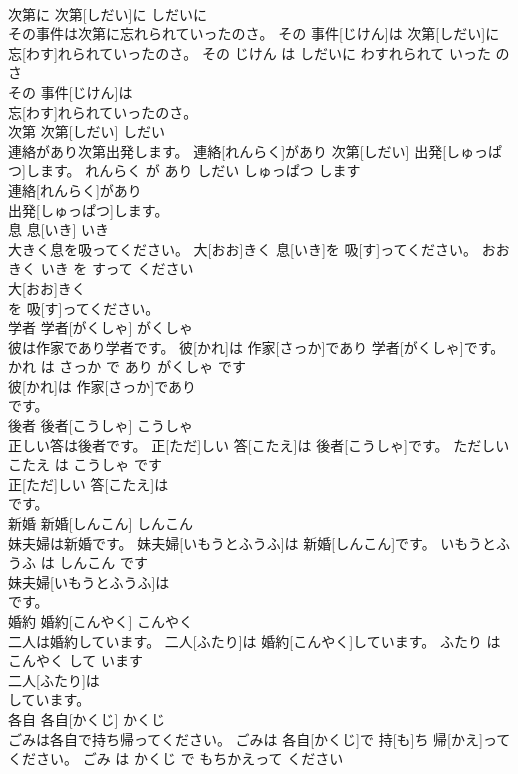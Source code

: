 \documentclass[8pt]{extreport}
\begin{document}
\begin{CJK}{UTF8}{min}
\\	次第に	次第[しだい]に	しだいに	
\\	その事件は次第に忘れられていったのさ。	その 事件[じけん]は 次第[しだい]に 忘[わす]れられていったのさ。	その じけん は しだいに わすれられて いった の さ	
\\	その 事件[じけん]は
\\	忘[わす]れられていったのさ。			
\\	次第	次第[しだい]	しだい	
\\	連絡があり次第出発します。	連絡[れんらく]があり 次第[しだい] 出発[しゅっぱつ]します。	れんらく が あり しだい しゅっぱつ します	
\\	連絡[れんらく]があり
\\	出発[しゅっぱつ]します。			
\\	息	息[いき]	いき	
\\	大きく息を吸ってください。	大[おお]きく 息[いき]を 吸[す]ってください。	おおきく いき を すって ください	
\\	大[おお]きく
\\	を 吸[す]ってください。			
\\	学者	学者[がくしゃ]	がくしゃ	
\\	彼は作家であり学者です。	彼[かれ]は 作家[さっか]であり 学者[がくしゃ]です。	かれ は さっか で あり がくしゃ です	
\\	彼[かれ]は 作家[さっか]であり
\\	です。			
\\	後者	後者[こうしゃ]	こうしゃ	
\\	正しい答は後者です。	正[ただ]しい 答[こたえ]は 後者[こうしゃ]です。	ただしい こたえ は こうしゃ です	
\\	正[ただ]しい 答[こたえ]は
\\	です。			
\\	新婚	新婚[しんこん]	しんこん	
\\	妹夫婦は新婚です。	妹夫婦[いもうとふうふ]は 新婚[しんこん]です。	いもうとふうふ は しんこん です	
\\	妹夫婦[いもうとふうふ]は
\\	です。			
\\	婚約	婚約[こんやく]	こんやく	
\\	二人は婚約しています。	二人[ふたり]は 婚約[こんやく]しています。	ふたり は こんやく して います	
\\	二人[ふたり]は
\\	しています。			
\\	各自	各自[かくじ]	かくじ	
\\	ごみは各自で持ち帰ってください。	ごみは 各自[かくじ]で 持[も]ち 帰[かえ]ってください。	ごみ は かくじ で もちかえって ください	

\end{CJK}
\end{document}
